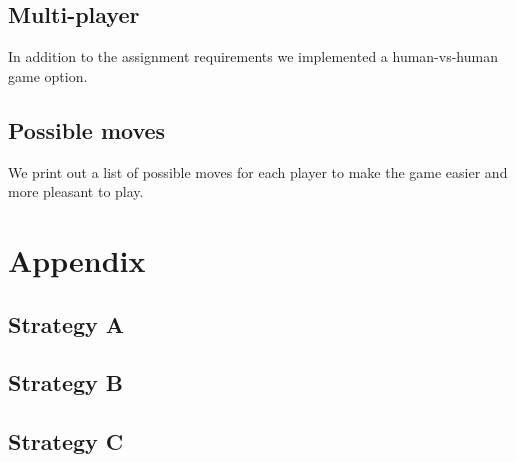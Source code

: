 \documentclass[12pt]{article}
\begin{document}
\subsection{Multi-player}
In addition to the assignment requirements we implemented a human-vs-human game option.

\subsection{Possible moves}
We print out a list of possible moves for each player to make the game easier and more pleasant to play.

\section{Appendix}

\subsection{Strategy A}

\subsection{Strategy B}

\subsection{Strategy C}



\end{document}
